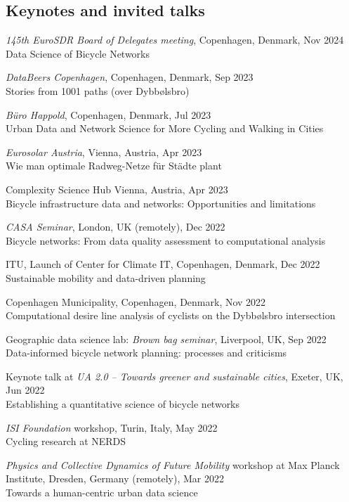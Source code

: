 \documentclass[10pt,a4paper]{article}
\renewenvironment{itemize}{
  \begin{list}{}{
    \setlength{\leftmargin}{1.5em}
    \setlength{\itemsep}{0.25em}
    \setlength{\parskip}{0pt}
    \setlength{\parsep}{0.25em}
  }
}{
  \end{list}
}
\begin{document}
\subsection*{Keynotes and invited talks}
\begin{itemize}
\item{\emph{145th EuroSDR Board of Delegates meeting}, Copenhagen, Denmark, Nov 2024\\Data Science of Bicycle Networks}
\item{\emph{DataBeers Copenhagen}, Copenhagen, Denmark, Sep 2023\\Stories from 1001 paths (over Dybbølsbro)}
\item{\emph{Büro Happold}, Copenhagen, Denmark, Jul 2023\\Urban Data and Network Science for More Cycling and Walking in Cities}
\item{\emph{Eurosolar Austria}, Vienna, Austria, Apr 2023\\Wie man optimale Radweg-Netze für Städte plant}
\item{Complexity Science Hub Vienna, Austria, Apr 2023\\Bicycle infrastructure data and networks: Opportunities and limitations}
\item{\emph{CASA Seminar}, London, UK (remotely), Dec 2022\\Bicycle networks: From data quality assessment to computational analysis}
\item{ITU, Launch of Center for Climate IT, Copenhagen, Denmark, Dec 2022\\Sustainable mobility and data-driven planning}
\item{Copenhagen Municipality, Copenhagen, Denmark, Nov 2022\\Computational desire line analysis of cyclists on the Dybbølsbro intersection}
\item{Geographic data science lab: \emph{Brown bag seminar}, Liverpool, UK, Sep 2022\\Data-informed bicycle network planning: processes and criticisms}
\item{Keynote talk at \emph{UA 2.0 – Towards greener and sustainable cities}, Exeter, UK, Jun 2022\\Establishing a quantitative science of bicycle networks}
\item{\emph{ISI Foundation} workshop, Turin, Italy, May 2022\\Cycling research at NERDS}
\item{\emph{Physics and Collective Dynamics of Future Mobility} workshop at Max Planck Institute, Dresden, Germany (remotely), Mar 2022\\Towards a human-centric urban data science}

\end{itemize}
\end{document}
